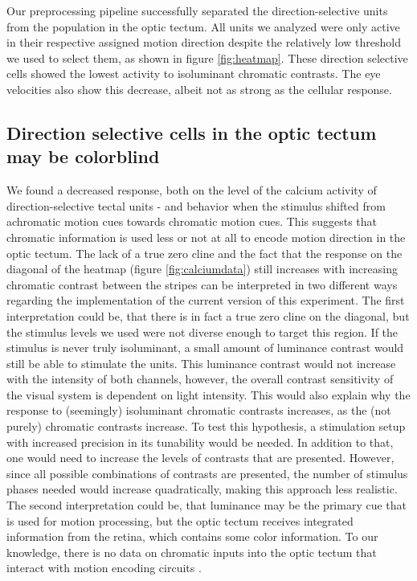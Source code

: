 Our preprocessing pipeline successfully separated the direction-selective units from the population in the optic tectum. All units we analyzed were only active in their respective assigned motion direction despite the relatively low threshold we used to select them, as shown in figure \ref{fig:heatmap}. These direction selective cells showed the lowest activity to isoluminant chromatic contrasts. The eye velocities also show this decrease, albeit not as strong as the cellular response.

\subsection{Direction selective cells in the optic tectum may be colorblind}

We found a decreased response, both on the level of the calcium activity of direction-selective tectal units - and behavior when the stimulus shifted from achromatic motion cues towards chromatic motion cues. This suggests that chromatic information is used less or not at all to encode motion direction in the optic tectum. 
The lack of a true zero cline and the fact that the response on the diagonal of the heatmap (figure \ref{fig:calciumdata}) still increases with increasing chromatic contrast between the stripes can be interpreted in two different ways regarding the implementation of the current version of this experiment. The first interpretation could be, that there is in fact a true zero cline on the diagonal, but the stimulus levels we used were not diverse enough to target this region. If the stimulus is never truly isoluminant, a small amount of luminance contrast would still be able to stimulate the units. This luminance contrast would not increase with the intensity of both channels, however, the overall contrast sensitivity of the visual system is dependent on light intensity. This would also explain why the response to (seemingly) isoluminant chromatic contrasts increases, as the (not purely) chromatic contrasts increase. To test this hypothesis, a stimulation setup with increased precision in its tunability would be needed. In addition to that, one would need to increase the levels of contrasts that are presented. However, since all possible combinations of contrasts are presented, the number of stimulus phases needed would increase quadratically, making this approach less realistic. The second interpretation could be, that luminance may be the primary cue that is used for motion processing, but the optic tectum receives integrated information from the retina, which contains some color information. To our knowledge, there is no data on chromatic inputs into the optic tectum that interact with motion encoding circuits \parencite{wangParallelChannelsMotion2020, ROBLES20142085}. 

